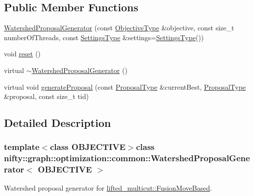 \subsection*{Public Member Functions}
\begin{DoxyCompactItemize}
\item 
\hyperlink{classnifty_1_1graph_1_1optimization_1_1common_1_1WatershedProposalGenerator_abdfe8bbd8c43ec05c65e9a14c525d8d8}{Watershed\+Proposal\+Generator} (const \hyperlink{classnifty_1_1graph_1_1optimization_1_1common_1_1WatershedProposalGenerator_a2de6e9c22ef125106cb152bcc78a9499}{Objective\+Type} \&objective, const size\+\_\+t number\+Of\+Threads, const \hyperlink{structnifty_1_1graph_1_1optimization_1_1common_1_1WatershedProposalGenerator_1_1SettingsType}{Settings\+Type} \&settings=\hyperlink{structnifty_1_1graph_1_1optimization_1_1common_1_1WatershedProposalGenerator_1_1SettingsType}{Settings\+Type}())
\item 
void \hyperlink{classnifty_1_1graph_1_1optimization_1_1common_1_1WatershedProposalGenerator_abf4b3f5ca30d3b05cf6f6d50ac3d7de7}{reset} ()
\item 
virtual \hyperlink{classnifty_1_1graph_1_1optimization_1_1common_1_1WatershedProposalGenerator_aadcf113cf5d11289a53266dca1a3225f}{$\sim$\+Watershed\+Proposal\+Generator} ()
\item 
virtual void \hyperlink{classnifty_1_1graph_1_1optimization_1_1common_1_1WatershedProposalGenerator_a24691eed151a87476d7e5152c2f7b918}{generate\+Proposal} (const \hyperlink{classnifty_1_1graph_1_1optimization_1_1common_1_1ProposalGeneratorBase_a4700eb43beb708a77c5c34612039c715}{Proposal\+Type} \&current\+Best, \hyperlink{classnifty_1_1graph_1_1optimization_1_1common_1_1ProposalGeneratorBase_a4700eb43beb708a77c5c34612039c715}{Proposal\+Type} \&proposal, const size\+\_\+t tid)
\end{DoxyCompactItemize}


\subsection{Detailed Description}
\subsubsection*{template$<$class O\+B\+J\+E\+C\+T\+I\+V\+E$>$class nifty\+::graph\+::optimization\+::common\+::\+Watershed\+Proposal\+Generator$<$ O\+B\+J\+E\+C\+T\+I\+V\+E $>$}

Watershed proposal generator for \hyperlink{classnifty_1_1graph_1_1optimization_1_1lifted__multicut_1_1FusionMoveBased}{lifted\+\_\+multicut\+::\+Fusion\+Move\+Based}. 


